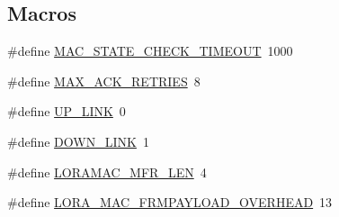 \subsection*{Macros}
\begin{DoxyCompactItemize}
\item 
\#define \hyperlink{group__LORAMAC_ga3468d8935b09a7191e43fecdd9a15c67}{M\+A\+C\+\_\+\+S\+T\+A\+T\+E\+\_\+\+C\+H\+E\+C\+K\+\_\+\+T\+I\+M\+E\+O\+UT}~1000
\item 
\#define \hyperlink{group__LORAMAC_ga47bc6aeb5be0ba39387e2049e342fa7e}{M\+A\+X\+\_\+\+A\+C\+K\+\_\+\+R\+E\+T\+R\+I\+ES}~8
\item 
\#define \hyperlink{group__LORAMAC_ga7e75f3071d6911b19a563d554038f8da}{U\+P\+\_\+\+L\+I\+NK}~0
\item 
\#define \hyperlink{group__LORAMAC_ga801525db3ba12b250029f026403524b7}{D\+O\+W\+N\+\_\+\+L\+I\+NK}~1
\item 
\#define \hyperlink{group__LORAMAC_ga1727f288e9a871f1474ce61f942a08f3}{L\+O\+R\+A\+M\+A\+C\+\_\+\+M\+F\+R\+\_\+\+L\+EN}~4
\item 
\#define \hyperlink{group__LORAMAC_ga9623296c345a3636f460ecdb8b1bbd9d}{L\+O\+R\+A\+\_\+\+M\+A\+C\+\_\+\+F\+R\+M\+P\+A\+Y\+L\+O\+A\+D\+\_\+\+O\+V\+E\+R\+H\+E\+AD}~13
\end{DoxyCompactItemize}

